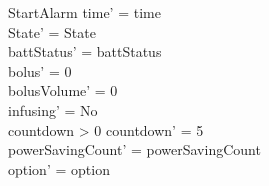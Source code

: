 \begin{schema}{StartAlarm}
	time' = time\\ State' = State\\
	battStatus' = battStatus\\
	bolus' = 0\\
	bolusVolume' = 0\\
	infusing' = No\\
	countdown > 0 \land countdown' = 5\\
	powerSavingCount' = powerSavingCount\\ option' = option\\
\end{schema}

